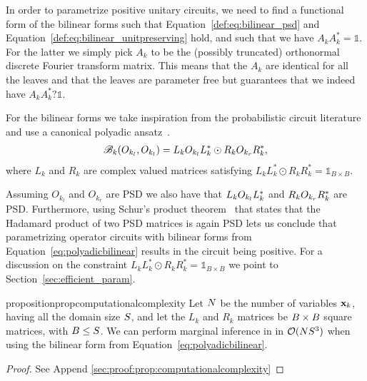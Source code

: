 In order to parametrize positive unitary circuits, we need to find a functional form of the bilinear forms such that Equation~\ref{def:eq:bilinear_psd} and Equation~\ref{def:eq:bilinear_unitpreserving} hold, and such that we have $A_k A_k^*=\mathbb{1}$.
For the latter we simply pick $A_k$ to be the (possibly truncated) orthonormal discrete Fourier transform matrix. This means that the $A_k$ are identical for all the leaves and that the leaves are parameter free but guarantees that we indeed have $A_kA_k^*?\mathbb{1}$.

For the bilinear forms we take inspiration from the probabilistic circuit literature and use a canonical polyadic ansatz~\citep{carroll1970analysis}.
\begin{align}
	\mathscr{B}_k (O_{k_l}, O_{k_l} )
	=
	L_k O_{k_l} L_k^* \odot R_k O_{k_r} R_k^*,
	\label{eq:polyadicbilinear}
\end{align}
where $L_k$ and $R_k$ are complex valued matrices satisfying $L_k L_k^* \odot R_k  R_k^* = \mathbb{1}_{B\times B}$.

Assuming $O_{k_l}$ and $O_{k_r}$ are PSD we also have that $L_k O_{k_l} L_k^*$ and $R_k O_{k_r} R_k^*$ are PSD. Furthermore, using Schur's product theorem~\citep[p. 14, Theorem VII]{schur1911bemerkungen} that states that the Hadamard product of two PSD matrices is again PSD lets us conclude that parametrizing operator circuits with bilinear forms from Equation~\ref{eq:polyadicbilinear} results in the circuit being positive. For a discussion on the constraint $L_k L_k^* \odot R_k  R_k^* = \mathbb{1}_{B\times B}$ we point to Section~\ref{sec:efficient_param}.



\begin{restatable}{proposition}{propcomputationalcomplexity}
	\label{prop:computationalcomplexity}
	Let $N$ be the number of variables $\mathbf{x}_k$,  having all the  domain size $S$, and let the $L_k$ and $R_k$ matrices be $B\times B$ square matrices, with $B\leq S$.
	We can perform marginal inference in \puncs in $\mathcal{O}(N S^3)$ when using the bilinear form from Equation~\ref{eq:polyadicbilinear}.
\end{restatable}

\begin{proof}
	See Append \ref{sec:proof:prop:computationalcomplexity}
\end{proof}












